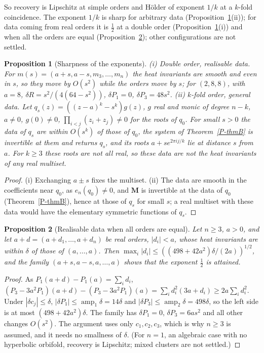 \documentclass[pdflatex,sn-mathphys-num]{sn-jnl}
\newcommand{\pref}[1]{\ref*{P-#1}}%
\newcommand{\amp}{\operatorname{amp}}
\theoremstyle{thmstyleone}%
\newtheorem{proposition}{Proposition}[section]%
\theoremstyle{thmstylethree}%
\providecommand{\amp}{\operatorname{amp}}
\begin{document}
So recovery is Lipschitz at simple orders and H\"older of exponent $1/k$ at a $k$-fold coincidence. The exponent $1/k$ is sharp for arbitrary data (Proposition~\ref{prop:sharpexp}(ii)); for data coming from real orders it is $\frac12$ at a double order (Proposition~\ref{prop:sharpexp}(i)) and when all the orders are equal (Proposition~\ref{rem:triple}); other configurations are not settled.

\begin{proposition}[Sharpness of the exponents]\label{prop:sharpexp}
(i) \emph{Double order, realisable data.} For $m(s)=(a+s,a-s,m_3,\dots,m_n)$ the heat invariants are smooth and even in $s$, so they move by $O(s^2)$ while the orders move by $s$; for $(2,8,8)$, with $a=8$, $\delta R=s^2/(4(64-s^2))$, $\delta P_1=0$, $\delta P_3=48s^2$. (ii) \emph{$k$-fold order, general data.} Let $q_s(z)=((z-a)^k-s^k)g(z)$, $g$ real and monic of degree $n-k$, $a\ne0$, $g(0)\ne0$, $\prod_{i<j}(z_i+z_j)\ne0$ for the roots of $q_0$. For small $s>0$ the data of $q_s$ are within $O(s^k)$ of those of $q_0$, the system of Theorem~\pref{thmB} is invertible at them and returns $q_s$, and its roots $a+se^{2\pi ij/k}$ lie at distance $s$ from $a$. For $k\ge3$ these roots are not all real, so these data are not the heat invariants of any real multiset.
\end{proposition}

\begin{proof}
(i) Exchanging $a\pm s$ fixes the multiset. (ii) The data are smooth in the coefficients near $q_0$, as $e_n(q_0)\ne0$, and $\mathbf M$ is invertible at the data of $q_0$ (Theorem~\pref{thmB}), hence at those of $q_s$ for small $s$; a real multiset with these data would have the elementary symmetric functions of $q_s$.
\end{proof}

\begin{proposition}[Realisable data when all orders are equal]\label{rem:triple}
Let $n\ge3$, $a>0$, and let $a+d=(a+d_1,\dots,a+d_n)$ be real orders, $|d_i|<a$, whose heat invariants are within $\delta$ of those of $(a,\dots,a)$. Then $\max_i|d_i|\le((498+42a^2)\delta/(2a))^{1/2}$, and the family $(a+s,a-s,a,\dots,a)$ shows that the exponent $\frac12$ is attained.
\end{proposition}

\begin{proof}
As $P_1(a+d)-P_1(a)=\sum_id_i$, $(P_3-3a^2P_1)(a+d)-(P_3-3a^2P_1)(a)=\sum_id_i^2(3a+d_i)\ge2a\sum_id_i^2$. Under $|\delta c_j|\le\delta$, $|\delta P_1|\le\amp_1\delta=14\delta$ and $|\delta P_3|\le\amp_2\delta=498\delta$, so the left side is at most $(498+42a^2)\delta$. The family has $\delta P_1=0$, $\delta P_3=6as^2$ and all other changes $O(s^2)$. The argument uses only $c_1,c_2,c_3$, which is why $n\ge3$ is assumed, and it needs no smallness of $\delta$. (For $n=1$, an algebraic case with no hyperbolic orbifold, recovery is Lipschitz; mixed clusters are not settled.)
\end{proof}
\end{document}
